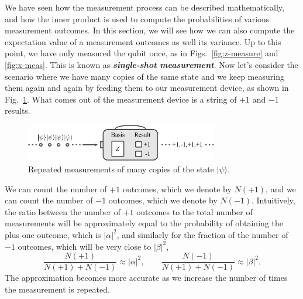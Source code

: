 We have seen how the measurement process can be described mathematically, and how the inner product is used to compute the probabilities of various measurement outcomes.
In this section, we will see how we can also compute the expectation value of a measurement outcomes as well its variance.
Up to this point, we have only measured the qubit once, as in Figs.~\ref{fig:z-measure} and \ref{fig:x-meas}.
This is known as \textbf{\emph{single-shot measurement}}.
Now let's consider the scenario where we have many copies of the same state \ket{\psi} and we keep measuring them again and again by feeding them to our measurement device, as shown in Fig.~\ref{fig:many-copies}. What comes out of the measurement device is a string of $+1$ and $-1$ results.
\begin{figure}[H]
    \centering
    \includegraphics[width=0.75\textwidth]{lesson2/2-2_measurement_many.pdf}
    \caption[Repeated measurements.]{Repeated measurements of many copies of the state $|\psi\rangle$.}
    \label{fig:many-copies}
\end{figure}

We can count the number of $+1$ outcomes, which we denote by $N(+1)$, and we can count the number of $-1$ outcomes, which we denote by $N(-1)$. Intuitively, the ratio between the number of $+1$ outcomes to the total number of measurements will be approximately equal to the probability of obtaining the plus one outcome, which is $|\alpha|^2$, and similarly for the fraction of the number of $-1$ outcomes, which will be very close to $|\beta|^2$,
\begin{equation}
    \frac{N(+1)}{N(+1)+N(-1)} \approx|\alpha|^{2}, \qquad \frac{N(-1)}{N(+1)+N(-1)} \approx|\beta|^{2}.
\end{equation}
The approximation becomes more accurate as we increase the number of times the measurement is repeated.

